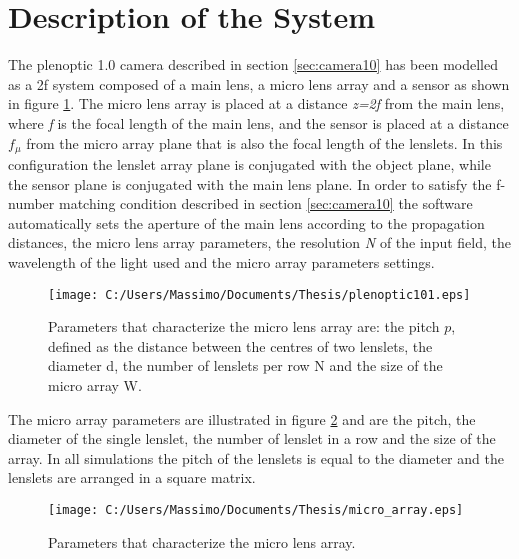 \section{Description of the System}
\label{sec:system10}
The plenoptic 1.0 camera described in section \ref{sec:camera10} has been modelled as a 2f system composed of a main lens, a micro lens array and a sensor as shown in figure \ref{fig:pleno10_system}. The micro lens array is placed at a distance \textit{z=2f} from the main lens, where \textit{f} is the focal length of the main lens, and the sensor is placed at a distance $f_\mu$ from the micro array plane that is also the focal length of the lenslets. In this configuration the lenslet array plane is conjugated with the object plane, while the sensor plane is conjugated with the main lens plane. In order to satisfy the f-number matching condition described in section \ref{sec:camera10} the software automatically sets the aperture of the main lens according to the propagation distances, the micro lens array parameters, the resolution \textit{N} of the input field, the wavelength of the light used and the micro array parameters settings. 
\begin{figure}[H]
	\centering
	\texttt{[image: C:/Users/Massimo/Documents/Thesis/plenoptic101.eps]}
	\caption{\label{fig:pleno10_system} Parameters that characterize the micro lens array are: the pitch $p$, defined as the distance between the centres of two lenslets, the diameter d, the number of lenslets per row N and the size of the micro array W. }
\end{figure}
The micro array parameters are illustrated in figure \ref{fig:microarray1} and are the pitch, the diameter of the single lenslet, the number of lenslet in a row and the size of the array. In all simulations the pitch of the lenslets is equal to the diameter and the lenslets are arranged in a square matrix. 
\begin{figure}[H]
	\centering
	\texttt{[image: C:/Users/Massimo/Documents/Thesis/micro\_array.eps]}
	\caption{\label{fig:microarray1} Parameters that characterize the micro lens array. }
\end{figure}
